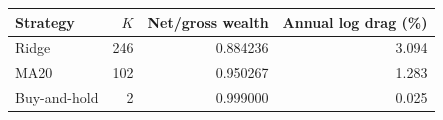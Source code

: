 \begin{tabular}{lrrr}
\toprule
Strategy & $K$ & Net/gross wealth & Annual log drag (\%) \\
\midrule
Ridge & 246 & 0.884236 & 3.094 \\
MA20 & 102 & 0.950267 & 1.283 \\
Buy-and-hold & 2 & 0.999000 & 0.025 \\
\bottomrule
\end{tabular}
